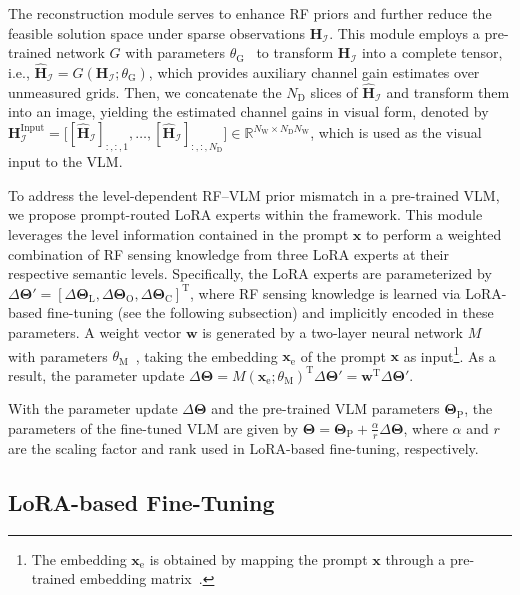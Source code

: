 \documentclass[journal,10pt,twocolumn]{IEEEtran}
\newcommand\IC{\ensuremath{\mathcal{I}}}
\newcommand\wB{\ensuremath{\bm{w}}}
\newcommand\xB{\ensuremath{\bm{x}}}
\newcommand\HF{\ensuremath{\mathbf{H}}}
\newcommand\CR{\ensuremath{\mathrm{C}}}
\newcommand\DR{\ensuremath{\mathrm{D}}}
\newcommand\GR{\ensuremath{\mathrm{G}}}
\newcommand\LR{\ensuremath{\mathrm{L}}}
\newcommand\MR{\ensuremath{\mathrm{M}}}
\newcommand\ROR{\ensuremath{\mathrm{O}}}
\newcommand\PR{\ensuremath{\mathrm{P}}}
\newcommand\TR{\ensuremath{\mathrm{T}}}
\newcommand\WR{\ensuremath{\mathrm{W}}}
\newcommand{\wh}{\widehat}
\begin{document}
The reconstruction module serves to enhance RF priors and further reduce the feasible solution space under sparse observations $\HF_{\IC}$. This module employs a pre-trained network $G$ with parameters $\theta_{\GR}$~\cite{hu2025advancing} to transform $\HF_{\IC}$ into a complete tensor, i.e., $\wh{\HF}_{\IC}=G(\HF_{\IC};\theta_{\GR})$, which provides auxiliary channel gain estimates over unmeasured grids. Then, we concatenate the $N_{\DR}$ slices of $\wh{\HF}_{\IC}$ and transform them into an image, yielding the estimated channel gains in visual form, denoted by $\HF_{\IC}^{\mathrm{Input}}=\big[[\wh{\HF}_{\IC}]_{:,:,1},\ldots,[\wh{\HF}_{\IC}]_{:,:,N_{\DR}}\big]\in\mathbb{R}^{N_{\WR}\times N_{\DR}N_{\WR}}$, which is used as the visual input to the VLM.

To address the level-dependent RF–VLM prior mismatch in a pre-trained VLM, we propose prompt-routed LoRA experts within the framework. This module leverages the level information contained in the prompt $\xB$ to perform a weighted combination of RF sensing knowledge from three LoRA experts at their respective semantic levels. Specifically, the LoRA experts are parameterized by $\Delta\mathbf{\Theta}'=[\Delta\mathbf{\Theta}_{\LR},\Delta\mathbf{\Theta}_{\ROR},\Delta\mathbf{\Theta}_{\CR}]^{\TR}$, where RF sensing knowledge is learned via LoRA-based fine-tuning (see the following subsection) and implicitly encoded in these parameters. A weight vector $\wB$ is generated by a two-layer neural network $M$ with parameters $\theta_{\MR}$~\cite{liu2024moe}, taking the embedding $\xB_{\mathrm{e}}$ of the prompt $\xB$ as input\footnote{The embedding $\xB_{\mathrm{e}}$ is obtained by mapping the prompt $\xB$ through a pre-trained embedding matrix~\cite{bai2025qwen2}.}. As a result, the parameter update $\Delta\mathbf{\Theta}=M(\xB_{\mathrm{e}};\theta_{\MR})^{\TR}\Delta\mathbf{\Theta}'=\wB^{\TR}\Delta\mathbf{\Theta}'$.  

With the parameter update  $\Delta\mathbf{\Theta}$ and the pre-trained VLM parameters $\mathbf{\Theta}_{\PR}$, the parameters of the fine-tuned VLM are given by $\mathbf{\Theta}=\mathbf{\Theta}_{\PR}+\frac{\alpha}{r}\Delta\mathbf{\Theta}$, where $\alpha$ and $r$ are the scaling factor and rank used in LoRA-based fine-tuning, respectively. 


\subsection{LoRA-based Fine-Tuning}
\end{document}
